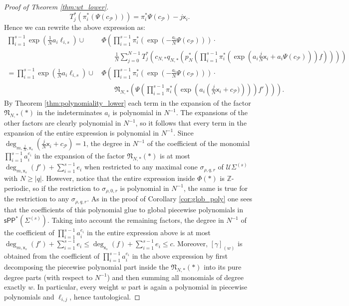 \documentclass[11pt]{article}
\newcommand{\sPP}{\mathsf{sPP}}
\newcommand{\spp}{\sPP}
\theoremstyle{definition}
\begin{document}
\begin{proof}[Proof of Theorem \ref{thm:wt_lower}]
	$$T_j ^{\ast}(\pi_i^{\ast}(\Psi(c_{\mathcal P})))=\pi_i^{\ast}\Psi(c_{\mathcal P})-j\mathsf{x}_i.$$
	Hence we can rewrite the above expression as:
	\begin{equation*}
    \begin{alignedat}{1}
		\prod_{i=1}^{s-1}\exp\left(\frac{1}{N}a_i\ell_{i,s}\right)\cup &\,\Phi\left(\prod_{i=1}^{s-1}\pi_i^{\ast}\left(\exp\left(-\frac{a_i}{N}\Psi(c_{\mathcal P})\right)\right)\cdot \right.\\
        &\qquad \left.\frac{1}{N}\sum_{j=0}^{N-1}T_j ^{\ast}\left(c_{N,\ast}q_{N,\ast}\left(p_N^{\ast}\left(\prod_{i=1}^{s-1}\pi_i^{\ast}\left(\exp\left(a_i \frac{j}{N}\mathsf{x}_i+a_i\Psi(c_{\mathcal P})\right)\right)f\right)\right)\right)\right)\\
		=\prod_{i=1}^{s-1}\exp\left(\frac{1}{N}a_i\ell_{i,s}\right)\cup&\,\Phi\left(\prod_{i=1}^{s-1}\pi_i^{\ast}\left(\exp\left(-\frac{a_i}{N}\Psi(c_{\mathcal P})\right)\right)\cdot\right.\\
		&\qquad \left.\mathfrak{N}_{N,\ast}\left(\Psi\left(\prod_{i=1}^{s-1}\pi_i^{\ast}\left(\exp\left(a_i\left(\frac{j}{N}\mathsf{x}_i+c_{\mathcal P})\right)\right)\right)f'\right)\right)\right).
	\end{alignedat}
    \end{equation*}
	By Theorem \ref{thm:polynomiality_lower} each term in the expansion of the factor $\mathfrak{N}_{N,\ast}(\ast)$ in the indeterminates $a_i$
	is polynomial in $N^{-1}$. The expansions of the other factors are clearly polynomial in $N^{-1}$, so it follows that every term in the expansion
	of the entire expression is polynomial in $N^{-1}$. Since $\deg_{m,\frac{j}{N},\mathsf{x}_s}\left(\frac{j}{N}\mathsf{x}_i+c_{\mathcal{P}}\right)=1$,
	the degree in $N^{-1}$ of the coefficient of the monomial $\prod_{i=1}^{s-1}a_i^{e_i}$ in the expansion of the factor $\mathfrak{N}_{N,\ast}(\ast)$
	is at most $\deg_{m,\mathsf{x}_s}(f')+\sum_{i=1}^{s-1}e_i$ when restricted to any maximal cone $\sigma_{\rho,q,r}$ of $\mathcal U\Sigma^{(s)}$ with $N\ge|q|$. However, notice that the entire expression inside
	$\Phi(\ast)$ is $\mathbb{Z}$-periodic, so if the restriction to $\sigma_{\rho,0,r}$ is polynomial in $N^{-1}$, the same is true for the restriction
	to any $\sigma_{\rho,q,r}$. As in the proof of Corollary
	\ref{cor:glob_poly} one sees that the coefficients of this polynomial
	glue to global piecewise polynomials in $\spp^{\ast}(\Sigma^{(s)})$. Taking into account the remaining factors, the degree in $N^{-1}$ of the
	coefficient of $\prod_{i=1}^{s-1}a_i^{e_i}$ in the entire expression above is at most $\deg_{m,\mathsf{x}_s}(f')+\sum_{i=1}^{s-1}e_i\le \deg_{\mathsf{x}_s}(f)+\sum_{i=1}^{s-1}e_i\le c$.
	Moreover, $[\gamma]_{(w)}$ is obtained from the coefficient of $\prod_{i=1}^{s-1}a_i^{e_i}$ in the above expression by
	first decomposing the piecewise polynomial
	part inside the $\mathfrak{N}_{N,\ast}(\ast)$ into its pure degree parts (with respect to $N^{-1}$)
	and then summing all monomials of degree exactly $w$.
	In particular, every weight $w$ part is again a polynomial in piecewise polynomials and $\ell_{i,j}$, hence tautological.
\end{proof}
\end{document}
